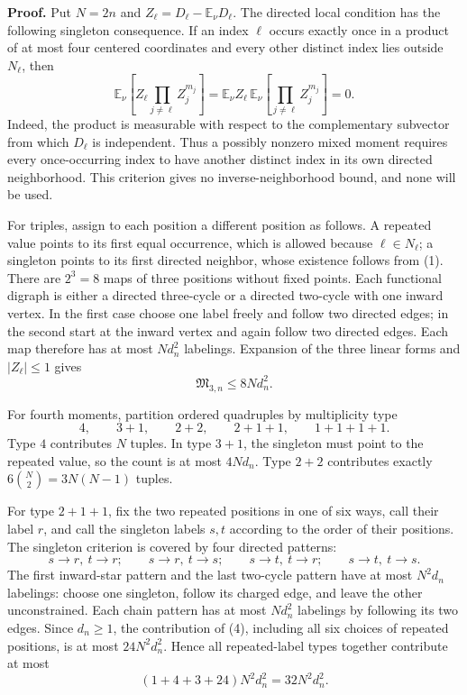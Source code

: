 \textbf{Proof.}
Put \(N=2n\) and \(Z_\ell=D_\ell-\mathbb E_\nu D_\ell\).  The directed local condition has the following singleton consequence.  If an index \(\ell\) occurs exactly once in a product of at most four centered coordinates and every other distinct index lies outside \(N_\ell\), then
\[
\mathbb E_\nu\!\left[Z_\ell\prod_{j\ne\ell}Z_j^{m_j}\right]
=\mathbb E_\nu Z_\ell\,
\mathbb E_\nu\!\left[\prod_{j\ne\ell}Z_j^{m_j}\right]=0.
\tag{1}
\]
Indeed, the product is measurable with respect to the complementary subvector from which \(D_\ell\) is independent.  Thus a possibly nonzero mixed moment requires every once-occurring index to have another distinct index in its own directed neighborhood.  This criterion gives no inverse-neighborhood bound, and none will be used.

For triples, assign to each position a different position as follows.  A repeated value points to its first equal occurrence, which is allowed because \(\ell\in N_\ell\); a singleton points to its first directed neighbor, whose existence follows from (1).  There are \(2^3=8\) maps of three positions without fixed points.  Each functional digraph is either a directed three-cycle or a directed two-cycle with one inward vertex.  In the first case choose one label freely and follow two directed edges; in the second start at the inward vertex and again follow two directed edges.  Each map therefore has at most \(Nd_n^2\) labelings.  Expansion of the three linear forms and \(|Z_\ell|\le1\) gives
\[
\mathfrak M_{3,n}\le8Nd_n^2.
\tag{2}
\]

For fourth moments, partition ordered quadruples by multiplicity type
\[
4,\qquad 3+1,\qquad 2+2,\qquad 2+1+1,\qquad 1+1+1+1.
\tag{3}
\]
Type \(4\) contributes \(N\) tuples.  In type \(3+1\), the singleton must point to the repeated value, so the count is at most \(4Nd_n\).  Type \(2+2\) contributes exactly \(6\binom N2=3N(N-1)\) tuples.

For type \(2+1+1\), fix the two repeated positions in one of six ways, call their label \(r\), and call the singleton labels \(s,t\) according to the order of their positions.  The singleton criterion is covered by four directed patterns:
\[
s\to r,\ t\to r;\qquad
s\to r,\ t\to s;\qquad
s\to t,\ t\to r;\qquad
s\to t,\ t\to s.
\tag{4}
\]
The first inward-star pattern and the last two-cycle pattern have at most \(N^2d_n\) labelings: choose one singleton, follow its charged edge, and leave the other unconstrained.  Each chain pattern has at most \(Nd_n^2\) labelings by following its two edges.  Since \(d_n\ge1\), the contribution of (4), including all six choices of repeated positions, is at most \(24N^2d_n^2\).  Hence all repeated-label types together contribute at most
\[
(1+4+3+24)N^2d_n^2=32N^2d_n^2.
\tag{5}
\]

